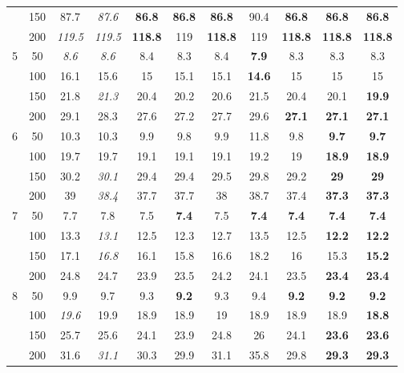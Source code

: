 \begin{table}[htbp]
{\begin{adjustbox}{angle=90}
\begin{tabular}{|c|c|c|c|c|c|c|c|c|c|c|}
     & 150 &  87.7 & \textit{87.6} & \textbf{86.8} & \textbf{86.8} & \textbf{86.8} & 90.4 & \textbf{86.8} & \textbf{86.8} & \textbf{86.8} \\ 
     & 200 & \textit{119.5} & \textit{119.5} & \textbf{118.8} & 119 & \textbf{118.8} & 119 & \textbf{118.8} & \textbf{118.8} & \textbf{118.8} \\ \hline
    5 & 50 & \textit{8.6} & \textit{8.6} & 8.4 & 8.3 & 8.4 & \textbf{7.9} & 8.3 & 8.3 & 8.3 \\ 
     & 100 & 16.1 & 15.6 & 15 & 15.1 & 15.1 & \textbf{14.6} & 15 & 15 & 15 \\ 
     & 150 & 21.8 & \textit{21.3} & 20.4 & 20.2 & 20.6 & 21.5 & 20.4 & 20.1 & \textbf{19.9} \\ 
     & 200 & 29.1 & 28.3 & 27.6 & 27.2 & 27.7 & 29.6 & \textbf{27.1} & \textbf{27.1} & \textbf{27.1} \\ \hline
    6 & 50 & 10.3 & 10.3 & 9.9 & 9.8 & 9.9 & 11.8 & 9.8 & \textbf{9.7} & \textbf{9.7} \\ 
     & 100 & 19.7 & 19.7 & 19.1 & 19.1 & 19.1 & 19.2 & 19 & \textbf{18.9} & \textbf{18.9} \\ 
     & 150 & 30.2 & \textit{30.1} & 29.4 & 29.4 & 29.5 & 29.8 & 29.2 & \textbf{29} & \textbf{29} \\ 
     & 200 & 39 & \textit{38.4} & 37.7 & 37.7 & 38 & 38.7 & 37.4 & \textbf{37.3} & \textbf{37.3} \\ \hline
    7 & 50 & 7.7 & 7.8 & 7.5 & \textbf{7.4} & 7.5 & \textbf{7.4} & \textbf{7.4} & \textbf{7.4} & \textbf{7.4} \\ 
     & 100 & 13.3 & \textit{13.1} & 12.5 & 12.3 & 12.7 & 13.5 & 12.5 & \textbf{12.2} & \textbf{12.2} \\ 
     & 150 & 17.1 & \textit{16.8} & 16.1 & 15.8 & 16.6 & 18.2 & 16 & 15.3 & \textbf{15.2} \\ 
     & 200 & 24.8 & 24.7 & 23.9 & 23.5 & 24.2 & 24.1 & 23.5 & \textbf{23.4} & \textbf{23.4} \\ \hline
    8 & 50 & 9.9 & 9.7 & 9.3 & \textbf{9.2} & 9.3 & 9.4 & \textbf{9.2} & \textbf{9.2} & \textbf{9.2} \\ 
     & 100 & \textit{19.6} & 19.9 & 18.9 & 18.9 & 19 & 18.9 & 18.9 & 18.9 & \textbf{18.8} \\ 
     & 150 & 25.7 & 25.6 & 24.1 & 23.9 & 24.8 & 26 & 24.1 & \textbf{23.6} & \textbf{23.6} \\ 
     & 200 & 31.6 & \textit{31.1} & 30.3 & 29.9 & 31.1 & 35.8 & 29.8 & \textbf{29.3} & \textbf{29.3} \\ \hline
    \end{tabular}
    \end{adjustbox}}
    \label{exp:literature_bins}
    \end{table}
    